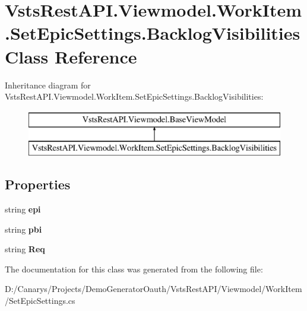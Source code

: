 \hypertarget{class_vsts_rest_a_p_i_1_1_viewmodel_1_1_work_item_1_1_set_epic_settings_1_1_backlog_visibilities}{}\section{Vsts\+Rest\+A\+P\+I.\+Viewmodel.\+Work\+Item.\+Set\+Epic\+Settings.\+Backlog\+Visibilities Class Reference}
\label{class_vsts_rest_a_p_i_1_1_viewmodel_1_1_work_item_1_1_set_epic_settings_1_1_backlog_visibilities}
Inheritance diagram for Vsts\+Rest\+A\+P\+I.\+Viewmodel.\+Work\+Item.\+Set\+Epic\+Settings.\+Backlog\+Visibilities\+:\begin{figure}[H]
\begin{center}
\leavevmode
\includegraphics[height=2.000000cm]{class_vsts_rest_a_p_i_1_1_viewmodel_1_1_work_item_1_1_set_epic_settings_1_1_backlog_visibilities}
\end{center}
\end{figure}
\subsection*{Properties}
\begin{DoxyCompactItemize}
\item 
\mbox{\label{class_vsts_rest_a_p_i_1_1_viewmodel_1_1_work_item_1_1_set_epic_settings_1_1_backlog_visibilities_a07c1edc7094917bee5ede0f972bef4a3}} 
string {\bfseries epi}
\item 
\mbox{\label{class_vsts_rest_a_p_i_1_1_viewmodel_1_1_work_item_1_1_set_epic_settings_1_1_backlog_visibilities_af8487683a549f2bf1edd0eb490dbae71}} 
string {\bfseries pbi}
\item 
\mbox{\label{class_vsts_rest_a_p_i_1_1_viewmodel_1_1_work_item_1_1_set_epic_settings_1_1_backlog_visibilities_a52d3ee01620d7d425764844a249ce375}} 
string {\bfseries Req}
\end{DoxyCompactItemize}


The documentation for this class was generated from the following file\+:\begin{DoxyCompactItemize}
\item 
D\+:/\+Canarys/\+Projects/\+Demo\+Generator\+Oauth/\+Vsts\+Rest\+A\+P\+I/\+Viewmodel/\+Work\+Item/Set\+Epic\+Settings.\+cs\end{DoxyCompactItemize}
